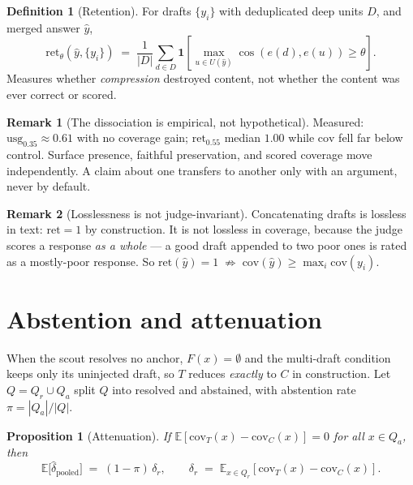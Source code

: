 \documentclass[11pt]{article}
\newtheorem{proposition}{Proposition}
\theoremstyle{definition}
\newtheorem{definition}{Definition}
\newtheorem{remark}{Remark}
\newcommand{\cov}{\mathrm{cov}}
\newcommand{\ret}{\mathrm{ret}}
\newcommand{\usg}{\mathrm{usg}}
\newcommand{\E}{\mathbb{E}}
\newcommand{\1}{\mathbf{1}}
\begin{document}
\begin{definition}[Retention]
For drafts $\{y_i\}$ with deduplicated deep units $D$, and merged answer
$\hat y$,
\[
  \ret_\theta(\hat y, \{y_i\}) \;=\; \frac{1}{|D|}
  \sum_{d \in D} \1\!\left[\max_{u \in U(\hat y)} \cos(e(d), e(u)) \ge \theta\right].
\]
Measures whether \emph{compression} destroyed content, not whether the content
was ever correct or scored.
\end{definition}

\begin{remark}[The dissociation is empirical, not hypothetical]
Measured: $\usg_{0.35} \approx 0.61$ with no coverage gain; $\ret_{0.55}$ median
$1.00$ while $\cov$ fell far below control. Surface presence, faithful
preservation, and scored coverage move independently. A claim about one
transfers to another only with an argument, never by default.
\end{remark}

\begin{remark}[Losslessness is not judge-invariant]
Concatenating drafts is lossless in text: $\ret = 1$ by construction. It is not
lossless in coverage, because the judge scores a response \emph{as a whole} --- a
good draft appended to two poor ones is rated as a mostly-poor response. So
$\ret(\hat y) = 1 \;\not\Rightarrow\; \cov(\hat y) \ge \max_i \cov(y_i)$.
\end{remark}

\section{Abstention and attenuation}

When the scout resolves no anchor, $F(x) = \emptyset$ and the multi-draft
condition keeps only its uninjected draft, so $T$ reduces \emph{exactly} to $C$
in construction. Let $Q = Q_r \cup Q_a$ split $Q$ into resolved and abstained,
with abstention rate $\pi = |Q_a| / |Q|$.

\begin{proposition}[Attenuation]
\label{prop:atten}
If $\E[\cov_T(x) - \cov_C(x)] = 0$ for all $x \in Q_a$, then
\[
  \E\big[\hat\delta_{\text{pooled}}\big] \;=\; (1 - \pi)\, \delta_r,
  \qquad
  \delta_r \;=\; \E_{x \in Q_r}\!\left[\cov_T(x) - \cov_C(x)\right].
\]
\end{proposition}
\end{document}
